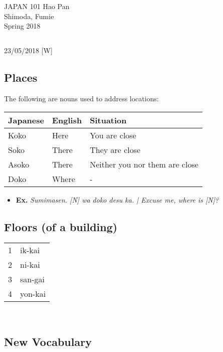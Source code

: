 \documentclass{article}
\begin{document}
 \begin{CJK}{UTF8}{min}

\noindent
{JAPAN 101 \hfill Hao Pan}\\
{Shimoda, Fumie}\\
{Spring 2018}


\begin{center}
\section{}
\noindent
{\hfill 23/05/2018 [W]}
\end{center}

\subsection{Places}

The following are nouns used to address locations:

\begin{tabular}{ l | l | l }
Japanese & English & Situation\\
\hline
Koko & Here & You are close\\
Soko & There & They are close\\
Asoko & There & Neither you nor them are close\\
Doko & Where & -
\end{tabular}

\begin{itemize}
\item {\bf Ex.} {\it Sumimasen. [N] wa doko desu ka. | Excuse me, where is [N]?}
\end{itemize}

\subsection{Floors (of a building)}

\begin{tabular}{ c | l }
1 & ik-kai\\
2 & ni-kai\\
3 & san-gai\\
4 & yon-kai
\end{tabular}\\

\subsection{New Vocabulary}


\end{CJK}
\end{document}
